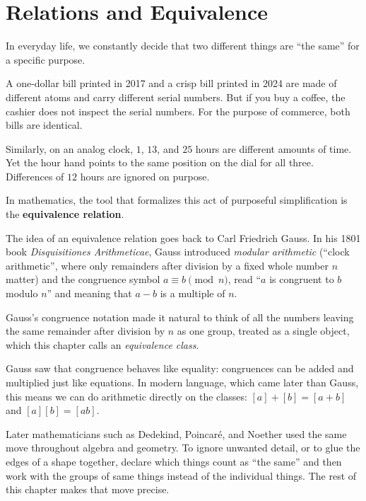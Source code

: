 \section{Relations and Equivalence}
\chapterline

In everyday life, we constantly decide that two different things are ``the same'' for a specific purpose. 

A one-dollar bill printed in 2017 and a crisp bill printed in 2024 are made of different atoms and carry different serial numbers. But if you buy a coffee, the cashier does not inspect the serial numbers. For the purpose of commerce, both bills are identical.

Similarly, on an analog clock, $1$, $13$, and $25$ hours are different amounts of time. Yet the hour hand points to the same position on the dial for all three. Differences of $12$ hours are ignored on purpose.

In mathematics, the tool that formalizes this act of purposeful simplification is the \textbf{equivalence relation}.

\begin{historybox}
The idea of an equivalence relation goes back to Carl Friedrich Gauss. In his 1801 book \emph{Disquisitiones Arithmeticae}, Gauss introduced \emph{modular arithmetic} (``clock arithmetic'', where only remainders after division by a fixed whole number $n$ matter) and the congruence symbol $a \equiv b \pmod n$, read ``$a$ is congruent to $b$ modulo $n$'' and meaning that $a - b$ is a multiple of $n$.

Gauss's congruence notation made it natural to think of all the numbers leaving the same remainder after division by $n$ as one group, treated as a single object, which this chapter calls an \emph{equivalence class}. 

Gauss saw that congruence behaves like equality: congruences can be added and multiplied just like equations. In modern language, which came later than Gauss, this means we can do arithmetic directly on the classes: $[a] + [b] = [a+b]$ and $[a][b] = [ab]$. 

Later mathematicians such as Dedekind, Poincar\'e, and Noether used the same move throughout algebra and geometry. To ignore unwanted detail, or to glue the edges of a shape together, declare which things count as ``the same'' and then work with the groups of same things instead of the individual things. The rest of this chapter makes that move precise.
\end{historybox}

